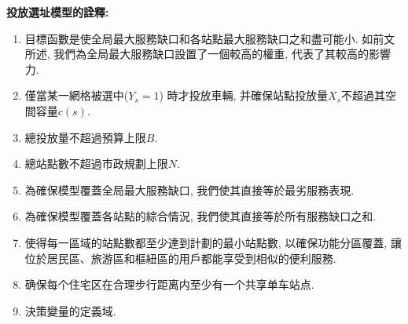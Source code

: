 \textbf{投放選址模型的詮釋: }
\begin{enumerate}[start=9]
    \item 目標函數是使全局最大服務缺口和各站點最大服務缺口之和盡可能小. 如前文所述, 我們為全局最大服務缺口設置了一個較高的權重, 代表了其較高的影響力. 
	\item 僅當某一網格被選中(\(Y_s=1\)) 時才投放車輛, 并確保站點投放量\(X_s\)不超過其空間容量\(c(s)\).
	\item 總投放量不超過預算上限\(B\).
	\item 總站點數不超過市政規劃上限\(N\).
	\item 為確保模型覆蓋全局最大服務缺口, 我們使其直接等於最劣服務表現.
	\item 為確保模型覆蓋各站點的綜合情況, 我們使其直接等於所有服務缺口之和.
	\item 使得每一區域的站點數都至少達到計劃的最小站點數, 以確保功能分區覆蓋, 讓位於居民區、旅游區和樞紐區的用戶都能享受到相似的便利服務.
	\item 确保每个住宅区在合理步行距离内至少有一个共享单车站点.
	\item 決策變量的定義域. 
\end{enumerate}
